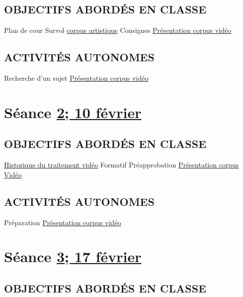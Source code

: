 \documentclass[
  french,
]{book}
\begin{document}
\hypertarget{objectifs-aborduxe9s-en-classe}{%
\subsection{OBJECTIFS ABORDÉS EN CLASSE}\label{objectifs-aborduxe9s-en-classe}}

Plan de cour
Survol \protect\hyperlink{corpus}{corpus artistique}
Consignes \protect\hyperlink{sommatif_1}{Présentation corpus vidéo}

\hypertarget{activituxe9s-autonomes}{%
\subsection{ACTIVITÉS AUTONOMES}\label{activituxe9s-autonomes}}

Recherche d'un sujet \protect\hyperlink{sommatif_1}{Présentation corpus vidéo}

\hypertarget{semaine_2}{%
\section{\texorpdfstring{Séance \protect\hyperlink{semaine_2}{2; 10 février}}{Séance 2; 10 février}}\label{semaine_2}}

\hypertarget{objectifs-aborduxe9s-en-classe-1}{%
\subsection{OBJECTIFS ABORDÉS EN CLASSE}\label{objectifs-aborduxe9s-en-classe-1}}

\protect\hyperlink{evolution_historique}{Historique du traitement vidéo}
Formatif Préapprobation \protect\hyperlink{sommatif_1}{Présentation corpus Vidéo}

\hypertarget{activituxe9s-autonomes-1}{%
\subsection{ACTIVITÉS AUTONOMES}\label{activituxe9s-autonomes-1}}

Préparation \protect\hyperlink{sommatif_1}{Présentation corpus vidéo}

\hypertarget{semaine_3}{%
\section{\texorpdfstring{Séance \protect\hyperlink{semaine_3}{3; 17 février}}{Séance 3; 17 février}}\label{semaine_3}}

\hypertarget{objectifs-aborduxe9s-en-classe-2}{%
\subsection{OBJECTIFS ABORDÉS EN CLASSE}\label{objectifs-aborduxe9s-en-classe-2}}
\end{document}
